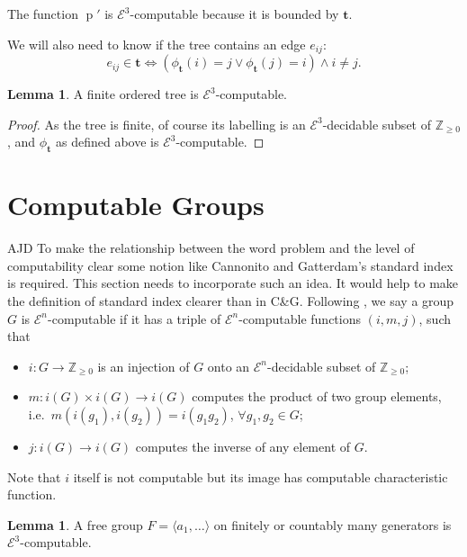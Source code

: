 \documentclass[a4paper]{article}
\newcommand{\grz}[1]{$\mathcal{E}^{#1}$}	%
\newcommand{\ZZ}{\mathbb{Z}}
\newcommand{\tvec}{\mathbf{t}}	%
\theoremstyle{plain}
\theoremstyle{definition}
\newtheorem{lemma}[theorem]{Lemma}
\newenvironment{ad}{\noindent\color{blue} AJD }{}
\newcommand{\ajd}[1]{
\begin{ad} #1 \end{ad}}
\begin{document}
The function $\operatorname{p}'$ is \grz{3}-computable because it is bounded by $\tvec$.

We will also need to know if the tree contains an edge $e_{ij}$:
\begin{equation} e_{ij} \in \tvec \Leftrightarrow \left ( \phi_{\tvec}(i) = j \vee \phi_{\tvec}(j) = i \right ) \wedge i \neq j. \end{equation}


\begin{lemma}
A finite ordered tree is \grz{3}-computable.
\end{lemma}

\begin{proof}
	As the tree is finite, of course its labelling is an \grz{3}-decidable subset of $\ZZ_{\geq 0}$, and $\phi_{\tvec}$ as defined above is \grz{3}-computable.
\end{proof}

\section{Computable Groups \label{groups}}

\ajd{To make the relationship between the word problem and the level
of computability clear some notion like Cannonito and Gatterdam's standard
index is required. This section needs to incorporate such an idea. It would
help to make the definition of standard index clearer than in C\&G.}  
Following \cite{Cannonito_1966}, we say a group $G$ is \grz{n}-computable if it has a triple of \grz{n}-computable functions $(i,m,j)$, such that

\begin{itemize}
	\item $i: G \rightarrow \ZZ_{\geq 0}$ is an injection of $G$ onto an \grz{n}-decidable subset of $\ZZ_{\geq 0}$;
	\item $m: i(G) \times i(G) \rightarrow i(G)$ computes the product of two group elements, i.e.\ $m \left(i(g_1),i(g_2)\right) = i(g_1g_2)$, $\forall g_1,g_2 \in G$;
	\item $j: i(G) \rightarrow i(G)$ computes the inverse of any element of $G$.
\end{itemize}

Note that $i$ itself is not computable but its image has computable characteristic function.

\begin{lemma}\cite[Lemma 3.1]{Cannonito_1973} \label{freegroupindex}
	A free group $F = \langle a_1, \dots \rangle$ on finitely or countably many generators is \grz{3}-computable.
\end{lemma}
\end{document}
